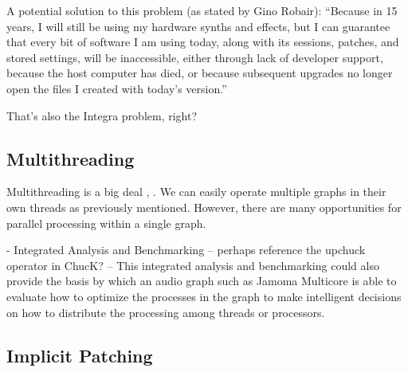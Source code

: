 \documentclass[twoside,a4paper]{article}
\begin{document}

A potential solution to this problem (as stated by Gino Robair):
``Because in 15 years, I will still be using my hardware synths and effects,
but I can guarantee that every bit of software I am using today, along with its sessions,
patches,
and stored settings,
will be inaccessible,
either through lack of developer support, because the host computer has died, 
or because subsequent upgrades no longer open the files I created with today's version.''

That's also the Integra problem, right?





\subsection{Multithreading} %

Multithreading is a big deal \cite{asanovic2008parallel}, \cite{multicoreICMC08}.  We can easily operate multiple graphs in their own threads as previously mentioned.  However, there are many opportunities for parallel processing within a single graph.

- Integrated Analysis and Benchmarking -- perhaps reference the upchuck operator in ChucK?
   -- This integrated analysis and benchmarking could also provide the basis by which an audio graph such as Jamoma Multicore is able to evaluate how to optimize the processes in the graph to make intelligent decisions on how to distribute the processing among threads or processors.




\subsection{Implicit Patching} %
\end{document}
